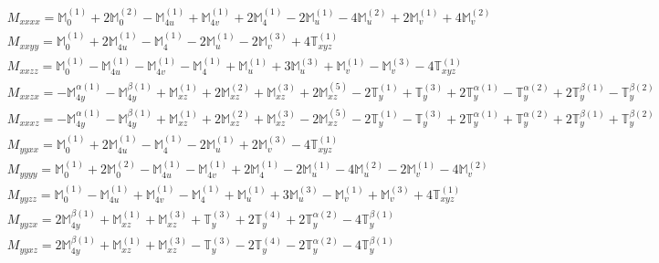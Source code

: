 \documentclass[fleqn,8pt,landscape]{jsarticle}
\begin{document}
\begin{align*}
& M_{xxxx} = \mathbb{M}_{0}^{(1)} + 2 \mathbb{M}_{0}^{(2)} - \mathbb{M}_{4u}^{(1)} + \mathbb{M}_{4v}^{(1)} + 2 \mathbb{M}_{4}^{(1)} - 2 \mathbb{M}_{u}^{(1)} - 4 \mathbb{M}_{u}^{(2)} + 2 \mathbb{M}_{v}^{(1)} + 4 \mathbb{M}_{v}^{(2)} \\
& M_{xxyy} = \mathbb{M}_{0}^{(1)} + 2 \mathbb{M}_{4u}^{(1)} - \mathbb{M}_{4}^{(1)} - 2 \mathbb{M}_{u}^{(1)} - 2 \mathbb{M}_{v}^{(3)} + 4 \mathbb{T}_{xyz}^{(1)} \\
& M_{xxzz} = \mathbb{M}_{0}^{(1)} - \mathbb{M}_{4u}^{(1)} - \mathbb{M}_{4v}^{(1)} - \mathbb{M}_{4}^{(1)} + \mathbb{M}_{u}^{(1)} + 3 \mathbb{M}_{u}^{(3)} + \mathbb{M}_{v}^{(1)} - \mathbb{M}_{v}^{(3)} - 4 \mathbb{T}_{xyz}^{(1)} \\
& M_{xxzx} = - \mathbb{M}_{4y}^{\alpha(1)} - \mathbb{M}_{4y}^{\beta(1)} + \mathbb{M}_{xz}^{(1)} + 2 \mathbb{M}_{xz}^{(2)} + \mathbb{M}_{xz}^{(3)} + 2 \mathbb{M}_{xz}^{(5)} - 2 \mathbb{T}_{y}^{(1)} + \mathbb{T}_{y}^{(3)} + 2 \mathbb{T}_{y}^{\alpha(1)} - \mathbb{T}_{y}^{\alpha(2)} + 2 \mathbb{T}_{y}^{\beta(1)} - \mathbb{T}_{y}^{\beta(2)} \\
& M_{xxxz} = - \mathbb{M}_{4y}^{\alpha(1)} - \mathbb{M}_{4y}^{\beta(1)} + \mathbb{M}_{xz}^{(1)} + 2 \mathbb{M}_{xz}^{(2)} + \mathbb{M}_{xz}^{(3)} - 2 \mathbb{M}_{xz}^{(5)} - 2 \mathbb{T}_{y}^{(1)} - \mathbb{T}_{y}^{(3)} + 2 \mathbb{T}_{y}^{\alpha(1)} + \mathbb{T}_{y}^{\alpha(2)} + 2 \mathbb{T}_{y}^{\beta(1)} + \mathbb{T}_{y}^{\beta(2)} \\
& M_{yyxx} = \mathbb{M}_{0}^{(1)} + 2 \mathbb{M}_{4u}^{(1)} - \mathbb{M}_{4}^{(1)} - 2 \mathbb{M}_{u}^{(1)} + 2 \mathbb{M}_{v}^{(3)} - 4 \mathbb{T}_{xyz}^{(1)} \\
& M_{yyyy} = \mathbb{M}_{0}^{(1)} + 2 \mathbb{M}_{0}^{(2)} - \mathbb{M}_{4u}^{(1)} - \mathbb{M}_{4v}^{(1)} + 2 \mathbb{M}_{4}^{(1)} - 2 \mathbb{M}_{u}^{(1)} - 4 \mathbb{M}_{u}^{(2)} - 2 \mathbb{M}_{v}^{(1)} - 4 \mathbb{M}_{v}^{(2)} \\
& M_{yyzz} = \mathbb{M}_{0}^{(1)} - \mathbb{M}_{4u}^{(1)} + \mathbb{M}_{4v}^{(1)} - \mathbb{M}_{4}^{(1)} + \mathbb{M}_{u}^{(1)} + 3 \mathbb{M}_{u}^{(3)} - \mathbb{M}_{v}^{(1)} + \mathbb{M}_{v}^{(3)} + 4 \mathbb{T}_{xyz}^{(1)} \\
& M_{yyzx} = 2 \mathbb{M}_{4y}^{\beta(1)} + \mathbb{M}_{xz}^{(1)} + \mathbb{M}_{xz}^{(3)} + \mathbb{T}_{y}^{(3)} + 2 \mathbb{T}_{y}^{(4)} + 2 \mathbb{T}_{y}^{\alpha(2)} - 4 \mathbb{T}_{y}^{\beta(1)} \\
& M_{yyxz} = 2 \mathbb{M}_{4y}^{\beta(1)} + \mathbb{M}_{xz}^{(1)} + \mathbb{M}_{xz}^{(3)} - \mathbb{T}_{y}^{(3)} - 2 \mathbb{T}_{y}^{(4)} - 2 \mathbb{T}_{y}^{\alpha(2)} - 4 \mathbb{T}_{y}^{\beta(1)} \\

\end{align*}
\end{document}

